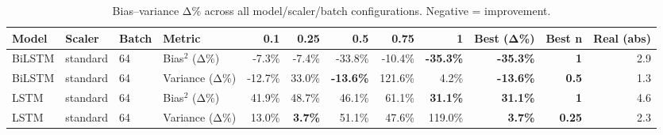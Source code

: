\renewcommand{\arraystretch}{1.2}
\begin{table}[!t]
\centering
\footnotesize
\caption{Bias–variance Δ\% across all model/scaler/batch configurations. Negative = improvement.}
\label{tab:bvdelta_all}
\setlength{\tabcolsep}{4pt}
\begin{tabular}{l l l l rrrrrrrr}
\toprule
Model & Scaler & Batch & Metric & 0.1 & 0.25 & 0.5 & 0.75 & 1 & Best (Δ\%) & Best n & Real (abs) \\
\midrule
BiLSTM & standard & 64 & Bias$^2$ (Δ\%) & -7.3\% & -7.4\% & -33.8\% & -10.4\% & \textbf{-35.3\%} & \textbf{-35.3\%} & \textbf{1} & 2.9 \\
BiLSTM & standard & 64 & Variance (Δ\%) & -12.7\% & 33.0\% & \textbf{-13.6\%} & 121.6\% & 4.2\% & \textbf{-13.6\%} & \textbf{0.5} & 1.3 \\
LSTM & standard & 64 & Bias$^2$ (Δ\%) & 41.9\% & 48.7\% & 46.1\% & 61.1\% & \textbf{31.1\%} & \textbf{31.1\%} & \textbf{1} & 4.6 \\
LSTM & standard & 64 & Variance (Δ\%) & 13.0\% & \textbf{3.7\%} & 51.1\% & 47.6\% & 119.0\% & \textbf{3.7\%} & \textbf{0.25} & 2.3 \\
\bottomrule
\end{tabular}

\end{table}
